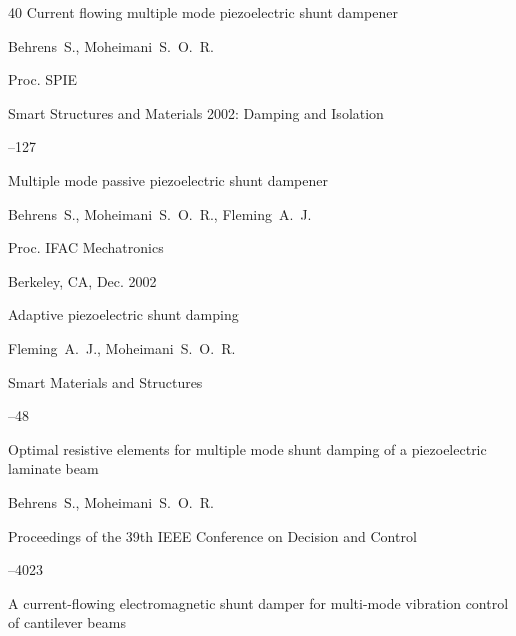 \begin{thebibliography}{40}
\paper Current flowing multiple mode piezoelectric shunt dampener

\by Behrens~S., Moheimani~S.~O.~R.

\jour Proc. SPIE 


\volinfo Smart Structures and Materials 2002: Damping and Isolation


--127





\paper Multiple mode passive piezoelectric shunt dampener

\by Behrens~S., Moheimani~S.~O.~R., Fleming~A.~J.

\inbook Proc. IFAC Mechatronics

\procinfo Berkeley, CA, Dec. 2002







\paper Adaptive piezoelectric shunt damping

\by Fleming~A.~J., Moheimani~S.~O.~R.

\jour Smart Materials and Structures




--48





\paper Optimal resistive elements for multiple mode shunt damping of a piezoelectric laminate beam

\by Behrens~S., Moheimani~S.~O.~R.

\inbook Proceedings of the 39th IEEE Conference on Decision and Control



--4023





\paper A current-flowing electromagnetic shunt damper for multi-mode vibration control of cantilever beams


\end{thebibliography}
